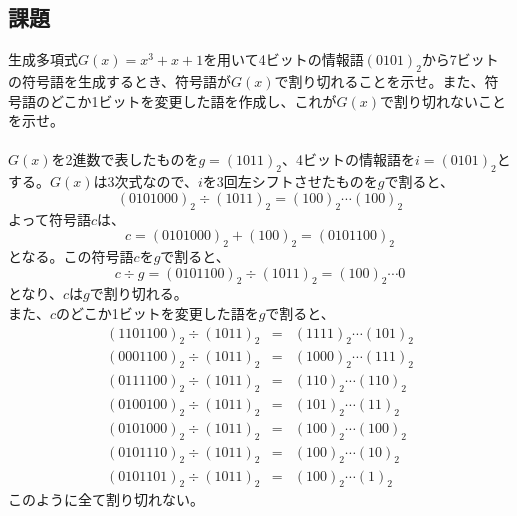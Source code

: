 \documentclass[a4j]{celb-report}
\begin{document}
\subsection{課題}
生成多項式$ G \left( x \right) = x ^3 + x + 1 $を用いて4ビットの情報語$ \left( 0101 \right) _2 $から7ビットの符号語を生成するとき、符号語が$ G \left( x \right) $で割り切れることを示せ。また、符号語のどこか1ビットを変更した語を作成し、これが$ G \left( x \right) $で割り切れないことを示せ。\\
\\
$ G \left( x \right) $を2進数で表したものを$ g = \left( 1011 \right) _2 $、4ビットの情報語を$ i = \left( 0101 \right) _2 $とする。$ G \left( x \right) $は3次式なので、$ i $を3回左シフトさせたものを$ g $で割ると、
\begin{equation}
	\left( 0101000 \right) _2 \div \left( 1011 \right) _2 = \left( 100 \right) _2 \cdots \left( 100 \right) _2
\end{equation}
よって符号語$ c $は、
\begin{equation}
	c = \left( 0101000 \right) _2 + \left( 100 \right) _2 = \left( 0101100 \right) _2
\end{equation}
となる。この符号語$ c $を$ g $で割ると、
\begin{equation}
	c \div g = \left( 0101100 \right) _2 \div \left( 1011 \right) _2 = \left( 100 \right) _2 \cdots 0
\end{equation}
となり、$ c $は$ g $で割り切れる。\\
また、$ c $のどこか1ビットを変更した語を$ g $で割ると、
\begin{eqnarray}
	\left( 1101100 \right) _2 \div \left( 1011 \right) _2 & = & \left( 1111 \right) _2 \cdots \left( 101 \right) _2 \\
	\left( 0001100 \right) _2 \div \left( 1011 \right) _2 & = & \left( 1000 \right) _2 \cdots \left( 111 \right) _2 \\
	\left( 0111100 \right) _2 \div \left( 1011 \right) _2 & = & \left( 110 \right) _2 \cdots \left( 110 \right) _2 \\
	\left( 0100100 \right) _2 \div \left( 1011 \right) _2 & = & \left( 101 \right) _2 \cdots \left( 11 \right) _2 \\
	\left( 0101000 \right) _2 \div \left( 1011 \right) _2 & = & \left( 100 \right) _2 \cdots \left( 100 \right) _2 \\
	\left( 0101110 \right) _2 \div \left( 1011 \right) _2 & = & \left( 100 \right) _2 \cdots \left( 10 \right) _2 \\
	\left( 0101101 \right) _2 \div \left( 1011 \right) _2 & = & \left( 100 \right) _2 \cdots \left( 1 \right) _2
\end{eqnarray}
このように全て割り切れない。
\end{document}

